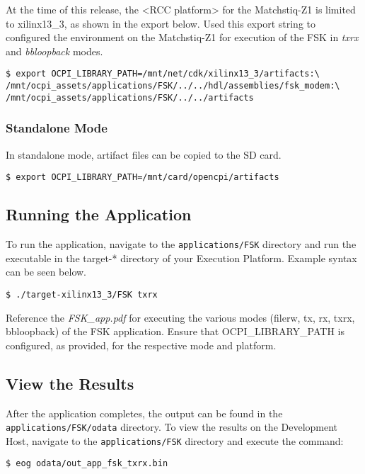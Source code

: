 \begin{flushleft}
At the time of this release, the <RCC platform> for the Matchstiq-Z1 is limited to xilinx13\_3, as shown in the export below. Used this export string to configured the environment on the Matchstiq-Z1 for execution of the FSK in \textit{txrx} and \textit{bbloopback} modes.
\begin{verbatim}
$ export OCPI_LIBRARY_PATH=/mnt/net/cdk/xilinx13_3/artifacts:\
/mnt/ocpi_assets/applications/FSK/../../hdl/assemblies/fsk_modem:\
/mnt/ocpi_assets/applications/FSK/../../artifacts
\end{verbatim}


\subsubsection{Standalone Mode}
In standalone mode, artifact files can be copied to the SD card.
\begin{verbatim}
$ export OCPI_LIBRARY_PATH=/mnt/card/opencpi/artifacts
\end{verbatim}
\subsection{Running the Application}
To run the application, navigate to the \texttt{applications/FSK} directory and run the executable in the target-* directory of your Execution Platform. Example syntax can be seen below.
\begin{verbatim}
$ ./target-xilinx13_3/FSK txrx
\end{verbatim}
Reference the \textit{FSK\_app.pdf} for executing the various modes (filerw, tx, rx, txrx, bbloopback) of the FSK application. Ensure that OCPI\_LIBRARY\_PATH is configured, as provided, for the respective mode and platform. \\ \medskip

\subsection{View the Results}
After the application completes, the output can be found in the \texttt{applications/FSK/odata} directory. To view the results on the Development Host, navigate to the \texttt{applications/FSK} directory and execute the command:
\begin{verbatim}
$ eog odata/out_app_fsk_txrx.bin
\end{verbatim}
\end{flushleft}

